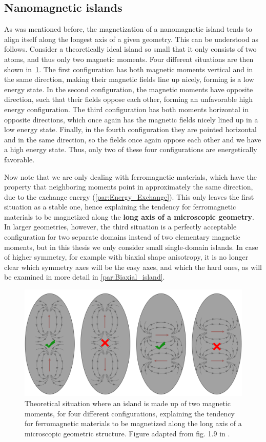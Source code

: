 \documentclass[11pt,a4paper,english]{article}
\begin{document}
\subsection{Nanomagnetic islands}
\label{par:Intro_nanomagnetic-islands}
As was mentioned before, the magnetization of a nanomagnetic island tends to align itself along the longest axis of a given geometry. This can be understood as follows. Consider a theoretically ideal island so small that it only consists of two atoms, and thus only two magnetic moments. Four different situations are then shown in~\cref{fig:Intro_IslandEllipticPreferredDirection}.
The first configuration has both magnetic moments vertical and in the same direction, making their magnetic fields line up nicely, forming is a low energy state. In the second configuration, the magnetic moments have opposite direction, such that their fields oppose each other, forming an unfavorable high energy configuration. The third configuration has both moments horizontal in opposite directions, which once again has the magnetic fields nicely lined up in a low energy state. Finally, in the fourth configuration they are pointed horizontal and in the same direction, so the fields once again oppose each other and we have a high energy state. Thus, only two of these four configurations are energetically favorable. \par
Now note that we are only dealing with ferromagnetic materials, which have the property that neighboring moments point in approximately the same direction, due to the exchange energy (\cref{par:Energy_Exchange}). This only leaves the first situation as a stable one, hence explaining the tendency for ferromagnetic materials to be magnetized along the \textbf{long axis of a microscopic geometry}. In larger geometries, however, the third situation is a perfectly acceptable configuration for two separate domains instead of two elementary magnetic moments, but in this thesis we only consider small single-domain islands. In case of higher symmetry, for example with biaxial shape anisotropy, it is no longer clear which symmetry axes will be the easy axes, and which the hard ones, as will be examined in more detail in \cref{par:Biaxial_island}. \par
\begin{figure}[t]
    \centering
    \includegraphics[width=0.8\columnwidth]{Figures/Introduction/NML_Carlton - Figure 1.9 adapted.png}
    \caption{Theoretical situation where an island is made up of two magnetic moments, for four different configurations, explaining the tendency for ferromagnetic materials to be magnetized along the long axis of a microscopic geometric structure. Figure adapted from fig. 1.9 in \cite{NML_Carlton}.}
    \label{fig:Intro_IslandEllipticPreferredDirection}
\end{figure}
\end{document}
